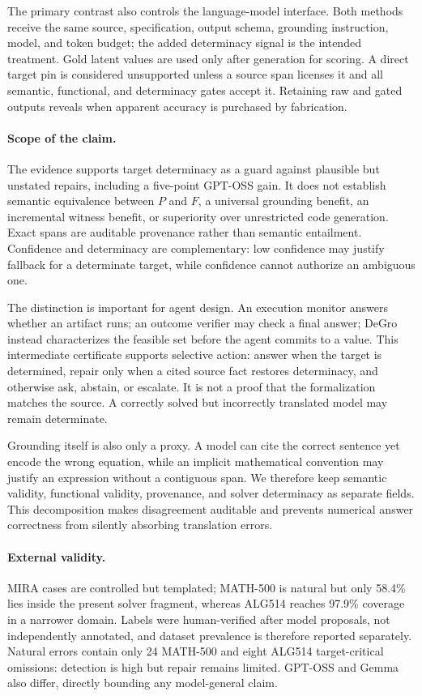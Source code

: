 \documentclass[sigconf,anonymous]{aamas}
\begin{document}
The primary contrast also controls the language-model interface.  Both methods receive the same source, specification, output schema, grounding instruction, model, and token budget; the added determinacy signal is the intended treatment.  Gold latent values are used only after generation for scoring.  A direct target pin is considered unsupported unless a source span licenses it and all semantic, functional, and determinacy gates accept it.  Retaining raw and gated outputs reveals when apparent accuracy is purchased by fabrication.

\paragraph{Scope of the claim.}
The evidence supports target determinacy as a guard against plausible but unstated repairs, including a five-point GPT-OSS gain.  It does not establish semantic equivalence between $P$ and $F$, a universal grounding benefit, an incremental witness benefit, or superiority over unrestricted code generation.  Exact spans are auditable provenance rather than semantic entailment.  Confidence and determinacy are complementary: low confidence may justify fallback for a determinate target, while confidence cannot authorize an ambiguous one.

The distinction is important for agent design.  An execution monitor answers whether an artifact runs; an outcome verifier may check a final answer; DeGro instead characterizes the feasible set before the agent commits to a value.  This intermediate certificate supports selective action: answer when the target is determined, repair only when a cited source fact restores determinacy, and otherwise ask, abstain, or escalate.  It is not a proof that the formalization matches the source.  A correctly solved but incorrectly translated model may remain determinate.

Grounding itself is also only a proxy.  A model can cite the correct sentence yet encode the wrong equation, while an implicit mathematical convention may justify an expression without a contiguous span.  We therefore keep semantic validity, functional validity, provenance, and solver determinacy as separate fields.  This decomposition makes disagreement auditable and prevents numerical answer correctness from silently absorbing translation errors.

\paragraph{External validity.}
MIRA cases are controlled but templated; MATH-500 is natural but only 58.4\% lies inside the present solver fragment, whereas ALG514 reaches 97.9\% coverage in a narrower domain.  Labels were human-verified after model proposals, not independently annotated, and dataset prevalence is therefore reported separately.  Natural errors contain only 24 MATH-500 and eight ALG514 target-critical omissions: detection is high but repair remains limited.  GPT-OSS and Gemma also differ, directly bounding any model-general claim.
\end{document}
